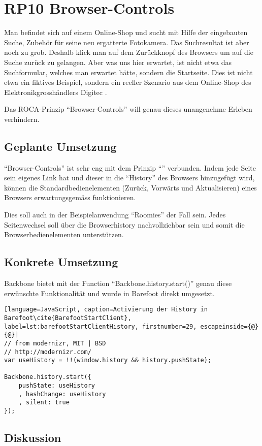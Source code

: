 \section{RP10 Browser-Controls}
\label{sec:principle-rp10-browser-controls}
Man befindet sich auf einem Online-Shop und sucht mit Hilfe der eingebauten Suche, Zubehör für seine neu ergatterte Fotokamera. Das Suchresultat ist aber noch zu grob. Deshalb klick man auf dem Zurückknopf des Browsers um auf die Suche zurück zu gelangen. Aber was uns hier erwartet, ist nicht etwa das Suchformular, welches man erwartet hätte, sondern die Startseite.
Dies ist nicht etwa ein fiktives Beispiel, sondern ein reeller Szenario aus dem Online-Shop des Elektronikgrosshändlers Digitec \cite{Digitec}.

Das ROCA-Prinzip ``Browser-Controls'' will genau dieses unangenehme Erleben verhindern.

\subsection*{Geplante Umsetzung}

``Browser-Controls'' ist sehr eng mit dem Prinzip ``'' verbunden. Indem jede Seite sein eigenes Link hat und dieser in die ``History'' des Browsers hinzugefügt wird, können die Standardbedienelementen (Zurück, Vorwärts und Aktualisieren) eines Browsers erwartungsgemäss funktionieren.

Dies soll auch in der Beispielanwendung ``Roomies'' der Fall sein. Jedes Seitenwechsel soll über die Browserhistory nachvollziehbar sein und somit die Browserbedienelementen unterstützen.

\subsection*{Konkrete Umsetzung}

Backbone bietet mit der Function ``Backbone.history.start()'' \cite{BackbonejsHistory} genau diese erwünschte Funktionalität und wurde in Barefoot direkt umgesetzt.

\begin{lstlisting}[language=JavaScript, caption=Activierung der History in Barefoot\cite{BarefootStartClient}, label=lst:barefootStartClientHistory, firstnumber=29, escapeinside={@}{@}]
// from modernizr, MIT | BSD
// http://modernizr.com/
var useHistory = !!(window.history && history.pushState);

Backbone.history.start({
	pushState: useHistory
	, hashChange: useHistory
	, silent: true
});
\end{lstlisting}

\subsection*{Diskussion}
